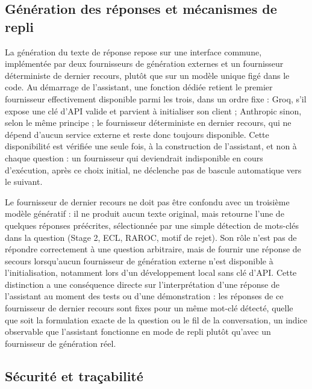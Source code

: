 \subsection{Génération des réponses et mécanismes de repli}

La génération du texte de réponse repose sur une interface commune, implémentée par deux fournisseurs de génération externes et un fournisseur déterministe de dernier recours, plutôt que sur un modèle unique figé dans le code. Au démarrage de l'assistant, une fonction dédiée retient le premier fournisseur effectivement disponible parmi les trois, dans un ordre fixe : Groq, s'il expose une clé d'API valide et parvient à initialiser son client ; Anthropic sinon, selon le même principe ; le fournisseur déterministe en dernier recours, qui ne dépend d'aucun service externe et reste donc toujours disponible. Cette disponibilité est vérifiée une seule fois, à la construction de l'assistant, et non à chaque question : un fournisseur qui deviendrait indisponible en cours d'exécution, après ce choix initial, ne déclenche pas de bascule automatique vers le suivant.

Le fournisseur de dernier recours ne doit pas être confondu avec un troisième modèle génératif : il ne produit aucun texte original, mais retourne l'une de quelques réponses préécrites, sélectionnée par une simple détection de mots-clés dans la question (Stage 2, ECL, RAROC, motif de rejet). Son rôle n'est pas de répondre correctement à une question arbitraire, mais de fournir une réponse de secours lorsqu'aucun fournisseur de génération externe n'est disponible à l'initialisation, notamment lors d'un développement local sans clé d'API. Cette distinction a une conséquence directe sur l'interprétation d'une réponse de l'assistant au moment des tests ou d'une démonstration : les réponses de ce fournisseur de dernier recours sont fixes pour un même mot-clé détecté, quelle que soit la formulation exacte de la question ou le fil de la conversation, un indice observable que l'assistant fonctionne en mode de repli plutôt qu'avec un fournisseur de génération réel.

\subsection{Sécurité et traçabilité}

